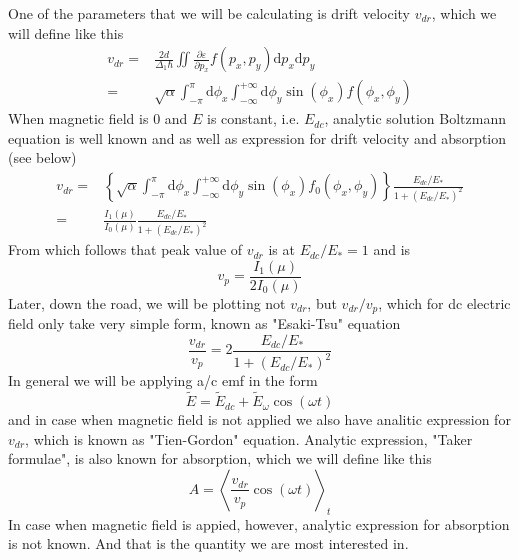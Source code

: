 \documentclass[40pt,letterpaper,physrev]{article}
\begin{document}
	One of the parameters that we will be calculating is drift 
	velocity $v_{dr}$, which we will define like this
	\begin{align}
		v_{dr}=&\frac{2d}{\Delta_1\hbar}\iint
			\frac{\partial\varepsilon}{\partial p_x}f(p_x,p_y)\text{d}p_x\text{d}p_y \\
			=&\sqrt{\alpha}\int^{\pi}_{-\pi}\text{d}\phi_x\int^{+\infty}_{-\infty}\text{d}\phi_y\sin(\phi_x)f(\phi_x,\phi_y)\label{eq:v_dr_generic}
	\end{align}
    When magnetic field is $0$ and $E$ is constant, i.e. $E_{dc}$, analytic 
    solution Boltzmann equation is well known and as well as expression for 
    drift velocity and absorption (see below) \cite{WAC01}
    \begin{align}
	v_{dr}=&\left \{ \sqrt{\alpha}\int^{\pi}_{-\pi}\text{d}\phi_x\int^{+\infty}_{-\infty}\text{d}\phi_y\sin(\phi_x)f_0(\phi_x,\phi_y)\right \}
	\frac{E_{dc}/E_*}{1+(E_{dc}/E_*)^2} \\
	=&\frac{I_1(\mu)}{I_0(\mu)}\frac{E_{dc}/E_*}{1+(E_{dc}/E_*)^2}
    \end{align}
	From which follows that peak value of $v_{dr}$ is at $E_{dc}/E_*=1$ and is 
	\begin{equation}
		v_p=\frac{I_1(\mu)}{2I_0(\mu)}\label{eq:v_peak}
	\end{equation}
	Later, down the road, we will be plotting not $v_{dr}$, but $v_{dr}/v_p$,
	which for dc electric field only take very simple form, known as "Esaki-Tsu" equation
	\begin{equation}
		\frac{v_{dr}}{v_p}=2\frac{E_{dc}/E_*}{1+(E_{dc}/E_*)^2}
	\end{equation}
	In general we will be applying a/c emf in the form 
	\begin{equation}
	\tilde{E}=\tilde{E}_{dc}+\tilde{E}_{\omega}\cos(\omega t)\label{eq:tilde_E_as_a_function_of_time}
	\end{equation}
	and in case when magnetic field is not applied we also have analitic expression for $v_{dr}$, which is known as "Tien-Gordon" equation. Analytic expression, "Taker formulae", is also known for absorption, which we will define like this
	\begin{equation}
	A=\left <\frac{v_{dr}}{v_p}\cos(\omega t) \right >_{t}
	\end{equation}
	In case when magnetic field is appied, however, analytic expression for absorption is not known. And that is the quantity we are most interested in.
	
\end{document}

